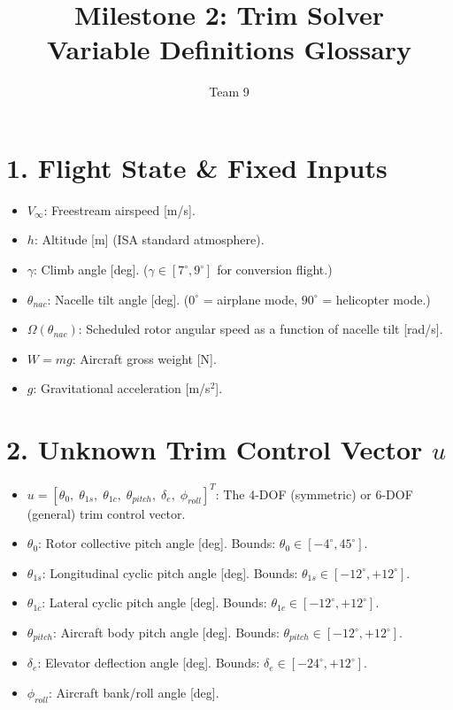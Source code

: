 \documentclass{article}
\title{Milestone 2: Trim Solver \\ \Large Variable Definitions Glossary}
\author{Team 9}
\date{}
\begin{document}
\maketitle

\section*{1. Flight State \& Fixed Inputs}
\begin{itemize}
    \item $V_\infty$: Freestream airspeed [m/s].
    \item $h$: Altitude [m] (ISA standard atmosphere).
    \item $\gamma$: Climb angle [deg]. ($\gamma \in [7^\circ, 9^\circ]$ for conversion flight.)
    \item $\theta_{nac}$: Nacelle tilt angle [deg]. ($0^\circ$ = airplane mode, $90^\circ$ = helicopter mode.)
    \item $\Omega(\theta_{nac})$: Scheduled rotor angular speed as a function of nacelle tilt [rad/s].
    \item $W = mg$: Aircraft gross weight [N].
    \item $g$: Gravitational acceleration [m/s$^2$].
\end{itemize}

\section*{2. Unknown Trim Control Vector $u$}
\begin{itemize}
    \item $u = [\theta_0,\; \theta_{1s},\; \theta_{1c},\; \theta_{pitch},\; \delta_e,\; \phi_{roll}]^T$: The 4-DOF (symmetric) or 6-DOF (general) trim control vector.
    \item $\theta_0$: Rotor collective pitch angle [deg]. Bounds: $\theta_0 \in [-4^\circ, 45^\circ]$.
    \item $\theta_{1s}$: Longitudinal cyclic pitch angle [deg]. Bounds: $\theta_{1s} \in [-12^\circ, +12^\circ]$.
    \item $\theta_{1c}$: Lateral cyclic pitch angle [deg]. Bounds: $\theta_{1c} \in [-12^\circ, +12^\circ]$.
    \item $\theta_{pitch}$: Aircraft body pitch angle [deg]. Bounds: $\theta_{pitch} \in [-12^\circ, +12^\circ]$.
    \item $\delta_e$: Elevator deflection angle [deg]. Bounds: $\delta_e \in [-24^\circ, +12^\circ]$.
    \item $\phi_{roll}$: Aircraft bank/roll angle [deg].
\end{itemize}
\end{document}
